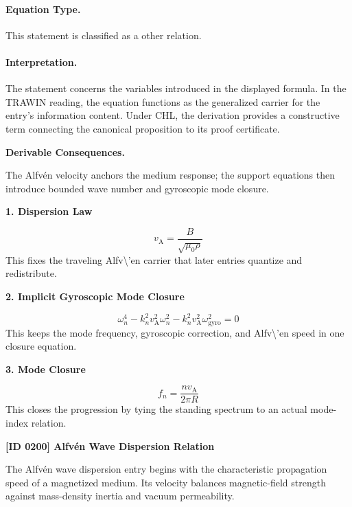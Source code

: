 \paragraph{Equation Type.}
This statement is classified as a other relation.

\paragraph{Interpretation.}
The statement concerns the variables introduced in the displayed formula. In the TRAWIN reading, the equation functions as the generalized carrier for the entry’s information content. Under CHL, the derivation provides a constructive term connecting the canonical proposition to its proof certificate.

\par\vspace{0.35em}
\noindent\textbf{Derivable Consequences.}\quad
\begingroup
\footnotesize
\raggedright
The Alfv\'en velocity anchors the medium response; the support equations then introduce bounded wave number and gyroscopic mode closure.
\par\endgroup

\noindent\textbf{1. Dispersion Law}\par
\[
v_{\mathrm{A}} = \frac{B}{\sqrt{\mu_0 \rho}}
\]
\noindent This fixes the traveling Alfv\textbackslash{}'en carrier that later entries quantize and redistribute.\par
\noindent\textbf{2. Implicit Gyroscopic Mode Closure}\par
\[
\omega_n^{4}
-
k_n^{2}v_{\mathrm{A}}^{2}\omega_n^{2}
-
k_n^{2}v_{\mathrm{A}}^{2}\omega_{\mathrm{gyro}}^{2}
=0
\]
\noindent This keeps the mode frequency, gyroscopic correction, and Alfv\textbackslash{}'en speed in one closure equation.\par
\noindent\textbf{3. Mode Closure}\par
\[
f_n = \frac{n v_{\mathrm{A}}}{2\pi R}
\]
\noindent This closes the progression by tying the standing spectrum to an actual mode-index relation.\par

\clearpage
\noindent\textbf{[ID 0200] Alfv\'en Wave Dispersion Relation}\par
\vspace{0.35em}
\begingroup\small


The Alfv\'en wave dispersion entry begins with the characteristic propagation speed of a magnetized medium. Its velocity balances magnetic-field strength against mass-density inertia and vacuum permeability.

